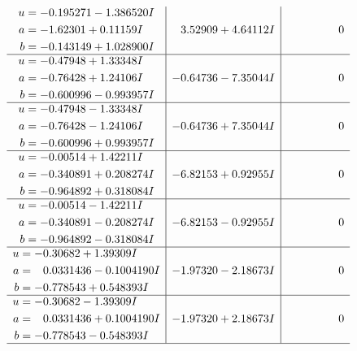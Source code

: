 \documentclass[1p]{elsarticle_modified}
\theoremstyle{definition}
\begin{document}
$$\begin{array}{c|c|c}
\begin{aligned}
u &= -0.195271 - 1.386520 I \\
a &= -1.62301 + 0.11159 I \\
b &= -0.143149 + 1.028900 I\end{aligned}
 & \phantom{-}3.52909 + 4.64112 I & \phantom{-0.000000 } 0 \\ \hline\begin{aligned}
u &= -0.47948 + 1.33348 I \\
a &= -0.76428 + 1.24106 I \\
b &= -0.600996 - 0.993957 I\end{aligned}
 & -0.64736 - 7.35044 I & \phantom{-0.000000 } 0 \\ \hline\begin{aligned}
u &= -0.47948 - 1.33348 I \\
a &= -0.76428 - 1.24106 I \\
b &= -0.600996 + 0.993957 I\end{aligned}
 & -0.64736 + 7.35044 I & \phantom{-0.000000 } 0 \\ \hline\begin{aligned}
u &= -0.00514 + 1.42211 I \\
a &= -0.340891 + 0.208274 I \\
b &= -0.964892 + 0.318084 I\end{aligned}
 & -6.82153 + 0.92955 I & \phantom{-0.000000 } 0 \\ \hline\begin{aligned}
u &= -0.00514 - 1.42211 I \\
a &= -0.340891 - 0.208274 I \\
b &= -0.964892 - 0.318084 I\end{aligned}
 & -6.82153 - 0.92955 I & \phantom{-0.000000 } 0 \\ \hline\begin{aligned}
u &= -0.30682 + 1.39309 I \\
a &= \phantom{-}0.0331436 - 0.1004190 I \\
b &= -0.778543 + 0.548393 I\end{aligned}
 & -1.97320 - 2.18673 I & \phantom{-0.000000 } 0 \\ \hline\begin{aligned}
u &= -0.30682 - 1.39309 I \\
a &= \phantom{-}0.0331436 + 0.1004190 I \\
b &= -0.778543 - 0.548393 I\end{aligned}
 & -1.97320 + 2.18673 I & \phantom{-0.000000 } 0\\
 \hline 

\end{array}$$
\end{document}
